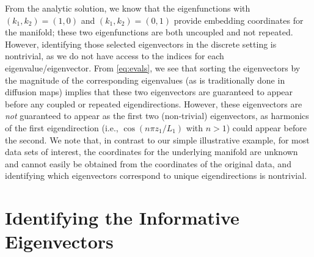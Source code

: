 From the analytic solution, we know that the eigenfunctions with $(k_1, k_2) =(1, 0)$ and $(k_1, k_2) =(0, 1)$ provide embedding coordinates for the manifold; these two eigenfunctions are both uncoupled and not repeated.
%
However, identifying those selected eigenvectors in the discrete setting is nontrivial, as we do not have access to the indices for each eigenvalue/eigenvector. 
%
From \eqref{eq:evals}, we see that sorting the eigenvectors by the magnitude of the corresponding eigenvalues (as is traditionally done in diffusion maps) implies that these two eigenvectors are guaranteed to appear before any coupled or repeated eigendirections.
%
However, these eigenvectors are {\em not} guaranteed to appear as the first two (non-trivial) eigenvectors, as harmonics of the first eigendirection (i.e., $\cos \left( n \pi z_1 / L_1 \right)$ with $n > 1$) could appear before the second.
%
We note that, in contrast to our simple illustrative example, for most data sets of interest, the coordinates for the underlying manifold are unknown and cannot easily be obtained from the coordinates of the original data, and identifying which eigenvectors correspond to unique eigendirections is nontrivial.

\section{Identifying the Informative Eigenvectors }

